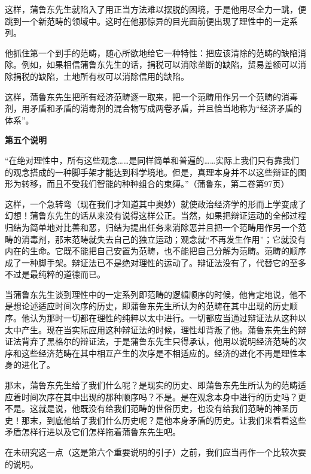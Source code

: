 \documentclass[a4paper,twoside,12pt]{ctexart}
\begin{document}
这样，蒲鲁东先生就陷入了用正当方法难以摆脱的困境，于是他用尽全力一跳，便跳到一个新范畴的领域中。这时在他那惊异的目光面前便出现了理性中的一定系列。

他抓住第一个到手的范畴，随心所欲地给它一种特性：把应该清除的范畴的缺陷消除。例如，如果相信蒲鲁东先生的话，捐税可以消除垄断的缺陷，贸易差额可以消除捐税的缺陷，土地所有权可以消除信用的缺陷。

这样，蒲鲁东先生把所有经济范畴逐一取来，把一个范畴用作另一个范畴的消毒剂，用矛盾和矛盾的消毒剂的混合物写成两卷矛盾，并且恰当地称为“经济矛盾的体系”。

\begin{center}
    \textbf{第五个说明}
\end{center}

\begin{fangsong}
    “在绝对理性中，所有这些观念……是同样简单和普遍的……实际上我们只有靠我们的观念搭成的一种脚手架才能达到科学境地。但是，真理本身并不以这些辩证的图形为转移，而且不受我们智能的种种组合的束缚。”（蒲鲁东，第二卷第97页）
\end{fangsong}

这样，一个急转弯（现在我们才知道其中奥妙）就使政治经济学的形而上学变成了幻想！蒲鲁东先生的话从来没有说得这样公正。当然，如果把辩证运动的全部过程归结为简单地对比善和恶，归结为提出任务来消除恶并且把一个范畴用作另一个范畴的消毒剂，那末范畴就失去自己的独立运动；观念就“不再发生作用”；它就没有内在的生命。它既不能把自己安置为范畴，也不能把自己分解为范畴。范畴的顺序成了一种脚手架。辩证法已不是绝对理性的运动了。辩证法没有了，代替它的至多不过是最纯粹的道德而已。

当蒲鲁东先生谈到理性中的一定系列即范畴的逻辑顺序的时候，他肯定地说，他不是想论述适应时间次序的历史，即蒲鲁东先生所认为的范畴在其中出现的历史顺序。他认为那时一切都在理性的纯粹以太中进行。一切都应当通过辩证法从这种以太中产生。现在当实际应用这种辩证法的时候，理性却背叛了他。蒲鲁东先生的辩证法背弃了黑格尔的辩证法，于是蒲鲁东先生只得承认，他用以说明经济范畴的次序和这些经济范畴在其中相互产生的次序是不相适应的。经济的进化不再是理性本身的进化了。

那末，蒲鲁东先生给了我们什么呢？是现实的历史、即蒲鲁东先生所认为的范畴适应着时间次序在其中出现的那种顺序吗？不是。是在观念本身中进行的历史吗？更不是。这就是说，他既没有给我们范畴的世俗历史，也没有给我们范畴的神圣历史！那末，到底他给了我们什么历史呢？是他本身矛盾的历史。让我们来看看这些矛盾怎样行进以及它们怎样拖着蒲鲁东先生吧。

在未研究这一点（这是第六个重要说明的引子）之前，我们应当再作一个比较次要的说明。
\end{document}
